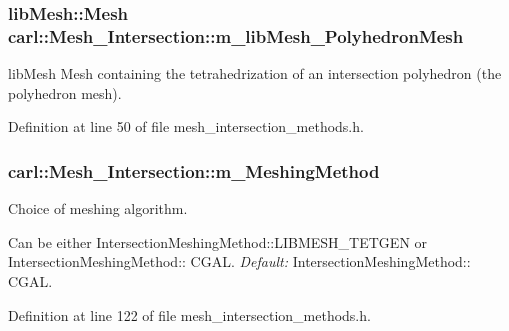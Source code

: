 \hypertarget{classcarl_1_1_mesh___intersection_a4377fd67cf7c486ba4263fe11b99a3cf}{}
\subsubsection[{m\+\_\+lib\+Mesh\+\_\+\+Polyhedron\+Mesh}]{\setlength{\rightskip}{0pt plus 5cm}lib\+Mesh\+::\+Mesh carl\+::\+Mesh\+\_\+\+Intersection\+::m\+\_\+lib\+Mesh\+\_\+\+Polyhedron\+Mesh\hspace{0.3cm}{\ttfamily [protected]}}\label{classcarl_1_1_mesh___intersection_a4377fd67cf7c486ba4263fe11b99a3cf}


lib\+Mesh Mesh containing the tetrahedrization of an intersection polyhedron (the polyhedron mesh). 



Definition at line 50 of file mesh\+\_\+intersection\+\_\+methods.\+h.

\hypertarget{classcarl_1_1_mesh___intersection_aa42a12f25859de7ce08655a1ada87e50}{}
\subsubsection[{m\+\_\+\+Meshing\+Method}]{ carl\+::\+Mesh\+\_\+\+Intersection\+::m\+\_\+\+Meshing\+Method\hspace{0.3cm}{\ttfamily [protected]}}\label{classcarl_1_1_mesh___intersection_aa42a12f25859de7ce08655a1ada87e50}


Choice of meshing algorithm. 

Can be either Intersection\+Meshing\+Method\+::\+L\+I\+B\+M\+E\+S\+H\+\_\+\+T\+E\+T\+G\+E\+N or Intersection\+Meshing\+Method\+:\+: C\+G\+A\+L. {\itshape Default\+:} Intersection\+Meshing\+Method\+:\+: C\+G\+A\+L. 

Definition at line 122 of file mesh\+\_\+intersection\+\_\+methods.\+h.

\hypertarget{classcarl_1_1_mesh___intersection_acd2052a59c0bc759f86b3e4810093a54}{}
